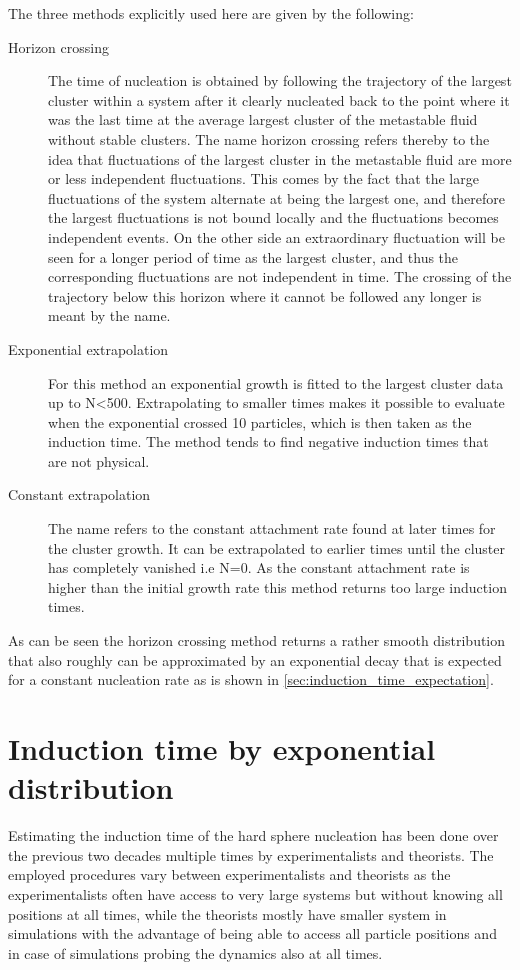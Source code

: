 The three methods explicitly used here are given by the following:
\begin{description}
\item[Horizon crossing]{The time of nucleation is obtained by following the trajectory of the largest cluster within a system after it clearly nucleated back to the point where it was the last time at the average largest cluster of the metastable fluid without stable clusters. The name horizon crossing refers thereby to the idea that fluctuations of the largest cluster in the metastable fluid are more or less independent fluctuations. This comes by the fact that the large fluctuations of the system alternate at being the largest one, and therefore the largest fluctuations is not bound locally and the fluctuations becomes independent events. On the other side an extraordinary fluctuation will be seen for a longer period of time as the largest cluster, and thus the corresponding fluctuations are not independent in time. The crossing of the trajectory below this horizon where it cannot be followed any longer is meant by the name.}

\item[Exponential extrapolation]{For this method an exponential growth is fitted to the largest cluster data up to N<500. Extrapolating to smaller times makes it possible to evaluate when the exponential crossed 10 particles, which is then taken as the induction time. The method tends to find negative induction times that are not physical.}

\item[Constant extrapolation]{The name refers to the constant attachment rate found at later times for the cluster growth. It can be extrapolated to earlier times until the cluster has completely vanished i.e N=0. As the constant attachment rate is higher than the initial growth rate this method returns too large induction times.}
\end{description}

As can be seen the horizon crossing method returns a rather smooth distribution that also roughly can be approximated by an exponential decay that is expected for a constant nucleation rate as is shown in \autoref{sec:induction_time_expectation}.\\


\section{Induction time by exponential distribution}
\label{sec:induction_times}
Estimating the induction time of the hard sphere nucleation has been done over the previous two decades multiple times by experimentalists and theorists. The employed procedures vary  between experimentalists and theorists as the experimentalists often have access to very large systems but without knowing all positions at all times, while the theorists mostly have smaller system in simulations with the advantage of being able to access all particle positions and in case of simulations probing the dynamics also at all times.\\


